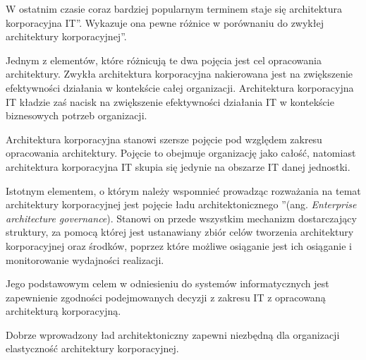 W ostatnim czasie coraz bardziej popularnym terminem staje się \quotedblbase architektura korporacyjna IT\textquotedblright. Wykazuje ona pewne różnice w porównaniu do \quotedblbase zwykłej architektury korporacyjnej\textquotedblright. 

Jednym z elementów, które różnicują te dwa pojęcia jest cel opracowania architektury. Zwykła architektura korporacyjna nakierowana jest na zwiększenie efektywności działania w kontekście całej organizacji. Architektura korporacyjna IT kładzie zaś nacisk na zwiększenie efektywności działania IT w kontekście biznesowych potrzeb organizacji. 

Architektura korporacyjna stanowi szersze pojęcie pod względem zakresu opracowania architektury. Pojęcie to obejmuje organizację jako całość, natomiast architektura korporacyjna IT skupia się jedynie na obszarze IT danej jednostki. 

Istotnym elementem, o którym należy wspomnieć prowadząc rozważania na temat architektury korporacyjnej jest pojęcie \quotedblbase ładu architektonicznego \textquotedblright (ang. \emph{Enterprise architecture governance}). Stanowi on przede wszystkim mechanizm dostarczający struktury, za pomocą której jest ustanawiany zbiór celów tworzenia architektury korporacyjnej oraz środków, poprzez które możliwe osiąganie jest ich osiąganie i monitorowanie wydajności realizacji. 

Jego podstawowym celem w odniesieniu do systemów informatycznych jest zapewnienie zgodności podejmowanych decyzji z zakresu IT z opracowaną architekturą korporacyjną. 

Dobrze wprowadzony ład architektoniczny zapewni niezbędną dla organizacji elastyczność architektury korporacyjnej.

